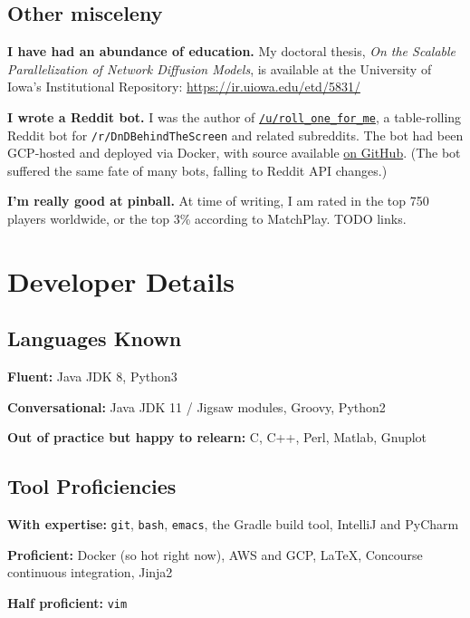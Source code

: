 \documentclass[10pt,letterpaper]{article}
\newcommand\ttt\texttt
\renewenvironment{itemize}{
  \begin{list}{}{
    \setlength{\leftmargin}{1.5em}
    \setlength{\itemsep}{0.25em}
    \setlength{\parskip}{0pt}
    \setlength{\parsep}{0.25em}
  }
}{
  \end{list}
}
\begin{document}
\subsection*{Other misceleny}
\begin{itemize}
  \item \textbf{I have had an abundance of education.} My doctoral thesis, {\em On the Scalable Parallelization of Network Diffusion Models},
    is available at the University of Iowa's Institutional Repository:  \url{https://ir.uiowa.edu/etd/5831/}

  \item \textbf{I wrote a Reddit bot.} I was the author of \href{https://www.reddit.com/user/roll_one_for_me}{\ttt{/u/roll\_one\_for\_me}},
    a table-rolling Reddit bot for \ttt{/r/DnDBehindTheScreen} and related subreddits.
    The bot had been GCP-hosted and deployed via Docker, with source available \href{https://github.com/PurelyApplied/roll_one_for_me/}{on GitHub}.
    (The bot suffered the same fate of many bots, falling to Reddit API changes.)
    
  \item \textbf{I'm really good at pinball.}  At time of writing, I am rated in the top 750 players worldwide, or the top 3\% according to MatchPlay. TODO links.

    
\end{itemize}


\newpage

\section*{Developer Details}
\subsection*{Languages Known}
\begin{itemize}
  \item \textbf{Fluent:}
    Java JDK 8,
    Python3
  \item \textbf{Conversational:}
    Java JDK 11 / Jigsaw modules,
    Groovy,
    Python2
  \item \textbf{Out of practice but happy to relearn:}
    C,
    C++,
    Perl,
    Matlab,
    Gnuplot
\end{itemize}

\subsection*{Tool Proficiencies}
\begin{itemize}
  \item \textbf{With expertise:}
    \ttt{git},
    \ttt{bash},
    \ttt{emacs},
    the Gradle build tool,
    IntelliJ and PyCharm
  \item \textbf{Proficient:} Docker (so hot right now),
    AWS and GCP,
    \LaTeX,
    Concourse continuous integration,
    Jinja2
  \item \textbf{Half proficient:}
    \ttt{vim}
\end{itemize}
\end{document}

